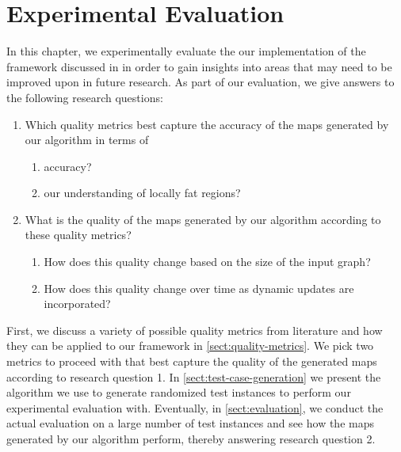 \chapter{Experimental Evaluation}
\label{chap:experimental-evaluation}

In this chapter, we experimentally evaluate the our implementation of the framework discussed in  in order to gain insights into areas that may need to be improved upon in future research.
As part of our evaluation, we give answers to the following research questions:

\begin{enumerate}
	\item Which quality metrics best capture the accuracy of the maps generated by our algorithm in terms of
	\begin{enumerate}
	\item accuracy?
	\item our understanding of locally fat regions?
	\end{enumerate}
	\item What is the quality of the maps generated by our algorithm according to these quality metrics?
	\begin{enumerate}
	\item How does this quality change based on the size of the input graph?
	\item How does this quality change over time as dynamic updates are incorporated?
	\end{enumerate}
\end{enumerate}

First, we discuss a variety of possible quality metrics from literature and how they can be applied to our framework in \cref{sect:quality-metrics}.
We pick two metrics to proceed with that best capture the quality of the generated maps according to research question 1.
In \cref{sect:test-case-generation} we present the algorithm we use to generate randomized test instances to perform our experimental evaluation with.
Eventually, in \cref{sect:evaluation}, we conduct the actual evaluation on a large number of test instances and see how the maps generated by our algorithm perform, thereby answering research question 2.


\clearpage

\clearpage


